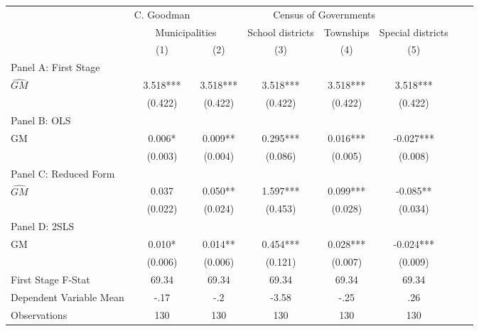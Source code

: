  \begin{tabular}{l*{7}{c}} \toprule
&\multicolumn{1}{c}{C. Goodman}&\multicolumn{4}{c}{Census of Governments}\\\cmidrule(lr){2-2}\cmidrule(lr){3-6}
&\multicolumn{2}{c}{Municipalities}&\multicolumn{1}{c}{School districts}&\multicolumn{1}{c}{Townships}&\multicolumn{1}{c}{Special districts}\\\cmidrule(lr){2-3}\cmidrule(lr){4-6}
&\multicolumn{1}{c}{(1)}&\multicolumn{1}{c}{(2)}&\multicolumn{1}{c}{(3)}&\multicolumn{1}{c}{(4)}&\multicolumn{1}{c}{(5)}\\
\cmidrule(lr){1-6}
\multicolumn{5}{l}{Panel A: First Stage}\\
\cmidrule(lr){1-6}
$\widehat{GM}$  &    3.518***&    3.518***&    3.518***&    3.518***&    3.518***\\
                &  (0.422)   &  (0.422)   &  (0.422)   &  (0.422)   &  (0.422)   \\
\cmidrule(lr){1-6}
\multicolumn{5}{l}{Panel B: OLS}\\
\cmidrule(lr){1-6}
GM              &    0.006*  &    0.009** &    0.295***&    0.016***&   -0.027***\\
                &  (0.003)   &  (0.004)   &  (0.086)   &  (0.005)   &  (0.008)   \\
\cmidrule(lr){1-6}
\multicolumn{5}{l}{Panel C: Reduced Form}\\
\cmidrule(lr){1-6}
$\widehat{GM}$  &    0.037   &    0.050** &    1.597***&    0.099***&   -0.085** \\
                &  (0.022)   &  (0.024)   &  (0.453)   &  (0.028)   &  (0.034)   \\
\cmidrule(lr){1-6}
\multicolumn{5}{l}{Panel D: 2SLS}\\
\cmidrule(lr){1-6}
GM              &    0.010*  &    0.014** &    0.454***&    0.028***&   -0.024***\\
                &  (0.006)   &  (0.006)   &  (0.121)   &  (0.007)   &  (0.009)   \\
\midrule
First Stage F-Stat&    69.34   &    69.34   &    69.34   &    69.34   &    69.34   \\
Dependent Variable Mean&     -.17   &      -.2   &    -3.58   &     -.25   &      .26   \\
Observations    &      130   &      130   &      130   &      130   &      130   \\
 \bottomrule \end{tabular}
